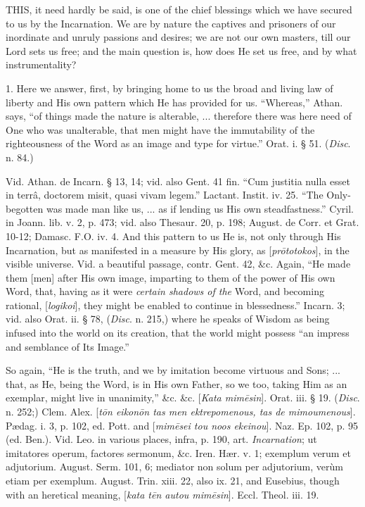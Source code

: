 
THIS,
it need hardly be said, is one of the chief blessings which we have
secured to us by the Incarnation. We are by nature the captives and
prisoners of our inordinate and unruly passions and desires; we are
not our own masters, till our Lord sets us free; and the main question
is, how does He set us free, and by what instrumentality?

1. Here we answer, first, by bringing home to us
the broad and living law of liberty and His own pattern which He has
provided for us. ``Whereas,'' Athan. says, ``of things made the nature is
alterable, ... therefore there was here need of One who was
unalterable, that men might have the immutability of the righteousness
of the Word as an image and type for virtue.'' Orat. i. § 51. (\emph{Disc}.
n. 84.)

Vid. Athan. de Incarn. § 13, 14; vid. also Gent.
41 fin. ``Cum justitia nulla esset in terrâ, doctorem misit, quasi
vivam legem.'' Lactant. Instit. iv. 25. ``The Only-begotten was made man
like us, ... as if lending us His own steadfastness.'' Cyril. in Joann.
lib. v. 2, p. 473; vid. also Thesaur. 20, p. 198; August. de Corr. et
Grat. 10-12; Damasc. F.O. iv. 4. And this pattern to us He is, not
only through His Incarnation, but as manifested in a measure by His
glory, as [\emph{pr\={o}totokos}], in the visible universe. Vid. a beautiful passage, contr. Gent. 42, \&c. Again, ``He made
them [men] after His own image, imparting to them of the power of His
own Word, that, having as it were \emph{certain
shadows of the} Word, and becoming rational, [\emph{logikoi}], they
might be enabled to continue in blessedness.'' Incarn. 3; vid. also
Orat. ii. § 78, (\emph{Disc}.
n. 215,) where he speaks of Wisdom as being infused into the world on
its creation, that the world might possess ``an impress and semblance
of Its Image.''

So again, ``He is the truth, and we by imitation
become virtuous and Sons; ... that, as He, being the Word, is in His
own Father, so we too, taking Him as an exemplar, might live in
unanimity,'' \&c. \&c. [\emph{Kata
mim\={e}sin}]. Orat.
iii. § 19. (\emph{Disc}. n. 252;) Clem. Alex. [\emph{t\={o}n
eikon\={o}n tas men ektrepomenous, tas de mimoumenous}].
Pædag. i. 3, p. 102, ed. Pott. and [\emph{mim\={e}sei
tou noos ekeinou}]. Naz.
Ep. 102, p. 95 (ed. Ben.). Vid. Leo. in various places, infra, p. 190,
art. \emph{Incarnation}; ut imitatores
operum, factores sermonum, \&c. Iren. Hær. v. 1; exemplum verum et
adjutorium. August. Serm. 101, 6; mediator non solum per adjutorium,
verùm etiam per exemplum. August. Trin. xiii. 22, also ix. 21, and
Eusebius, though with an heretical meaning, [\emph{kata
t\={e}n autou mim\={e}sin}].
Eccl. Theol. iii. 19.

